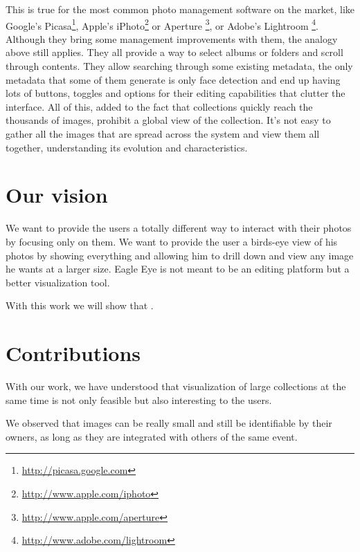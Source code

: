 This is true for the most common photo management software on the market, like Google's Picasa\footnote{\url{http://picasa.google.com}}, Apple's iPhoto\footnote{\url{http://www.apple.com/iphoto}} or Aperture \footnote{\url{http://www.apple.com/aperture}}, or Adobe's Lightroom \footnote{\url{http://www.adobe.com/lightroom}}. Although they bring some management improvements with them, the analogy above still applies. They all provide a way to select albums or folders and scroll through contents. They allow searching through some existing metadata, the only metadata that some of them generate is only face detection and end up having lots of buttons, toggles and options for their editing capabilities that clutter the interface. All of this, added to the fact that collections quickly reach the thousands of images, prohibit a global view of the collection. It's not easy to gather all the images that are spread across the system and view them all together, understanding its evolution and characteristics.


\section{Our vision} %
\label{ssub:our_vision}


We want to provide the users a totally different way to interact with their photos by focusing only on them. We want to provide the user a birds-eye view of his photos by showing everything and allowing him to drill down and view any image he wants at a larger size. Eagle Eye is not meant to be an editing platform but a better visualization tool.

With this work we will show that .




\section{Contributions} %
\label{sec:contributions}

With our work, we have understood that visualization of large collections at the same time is not only feasible but also interesting to the users. 

We observed that images can be really small and still be identifiable by their owners, as long as they are integrated with others of the same event.

